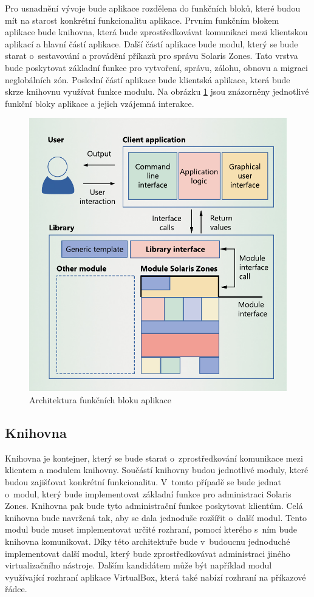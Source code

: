 Pro usnadnění vývoje bude aplikace rozdělena do funkčních bloků, které budou mít na starost konkrétní funkcionalitu aplikace. Prvním
funkčním blokem aplikace bude knihovna, která bude zprostředkovávat komunikaci mezi klientskou aplikací a hlavní částí aplikace.
Další částí aplikace bude modul, který se bude starat o~sestavování a provádění příkazů pro správu Solaris Zones.
Tato vrstva bude poskytovat základní funkce pro vytvoření, správu, zálohu, obnovu a migraci neglobálních zón. Poslední částí aplikace
bude klientská aplikace, která bude skrze knihovnu využívat funkce modulu. Na obrázku \ref{image:architecture} jsou znázorněny 
jednotlivé funkční bloky aplikace a jejich vzájemná interakce.
\begin{figure}
    \centering    
    \includegraphics[scale=0.65]{assets/pdfs/architecture.pdf}
    \caption{Architektura funkčních bloku aplikace}
    \label{image:architecture}
\end{figure}
\subsection{Knihovna}
\label{chapter:design:architecture:library}
Knihovna je kontejner, který se bude starat o~zprostředkování komunikace mezi klientem a modulem knihovny. Součástí
knihovny budou jednotlivé moduly, které budou zajišťovat konkrétní funkcionalitu. V~tomto případě se bude jednat o~modul, který
bude implementovat základní funkce pro administraci Solaris Zones. Knihovna pak bude tyto administrační funkce poskytovat klientům.
Celá knihovna bude navržená tak, aby se dala jednoduše rozšířit o~další modul. Tento modul bude muset implementovat určité
rozhraní, pomocí kterého s~ním bude knihovna komunikovat. Díky této architektuře bude v~budoucnu jednoduché implementovat
další modul, který bude zprostředkovávat administraci jiného virtualizačního nástroje. Dalším kandidátem může být například
modul využívající rozhraní aplikace VirtualBox, která také nabízí rozhraní na příkazové řádce.

